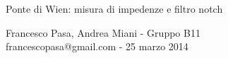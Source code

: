 \documentclass[11pt, twoside, a4paper]{article}
\begin{document}
\begin{center}

        {\huge Ponte di Wien: misura di impedenze e filtro notch}
    \vspace{0.1cm}

      	{Francesco Pasa, Andrea Miani - Gruppo B11} \\
      	{francescopasa@gmail.com - 25 marzo 2014}
    \vspace{-0.2cm}

\end{center}





\end{document}
